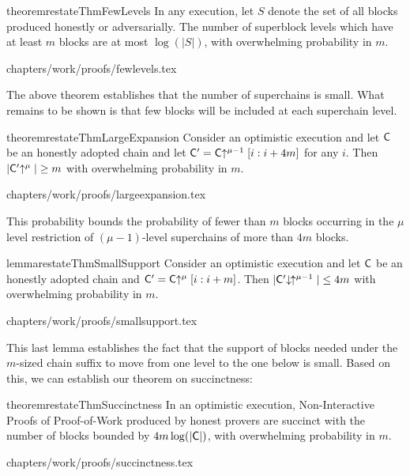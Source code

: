 \begin{restatable}{theorem}{restateThmFewLevels}
    \label{thm.few-levels}
    In any execution, let $S$ denote the set of all blocks produced honestly or
    adversarially. The number of superblock levels which have at least $m$
    blocks are at most $\log(|S|)$, with overwhelming probability in $m$.
\end{restatable}
{chapters/work/proofs/fewlevels.tex}

The above theorem establishes that the number of superchains is small. What
remains to be shown is that few blocks will be included at each superchain
level.

\begin{restatable}{theorem}{restateThmLargeExpansion}
    \label{thm.large-expansion}
    Consider an optimistic execution and let $\mathsf{C}$ be an honestly adopted
    chain and let $\mathsf{C}' = \mathsf{C}\negthickspace\uparrow^{\mu - 1}[i:i + 4m]$ for any $i$.
    Then $|\mathsf{C}'\negthickspace\uparrow^\mu| \geq m$ with overwhelming probability in $m$.
\end{restatable}
{chapters/work/proofs/largeexpansion.tex}

This probability bounds the probability of fewer than $m$ blocks occurring in
the $\mu$ level restriction of $(\mu - 1)$-level superchains of more than $4m$
blocks.

\begin{restatable}{lemma}{restateThmSmallSupport}
    \label{lem.small-support}
    Consider an optimistic execution and let $\mathsf{C}$ be an honestly adopted
    chain and $\mathsf{C}' = \mathsf{C}\negthickspace\uparrow^\mu[i:i + m]$. Then
    $|\mathsf{C}'\negthickspace\downarrow\,\negthickspace\uparrow^{\mu - 1}| \leq 4m$ with overwhelming
    probability in $m$.
\end{restatable}
{chapters/work/proofs/smallsupport.tex}

This last lemma establishes the fact that the support of blocks needed under
the $m$-sized chain suffix to move from one level to the one below is small.
Based on this, we can establish our theorem on succinctness:

\begin{restatable}{theorem}{restateThmSuccinctness}
    \label{thm.succinctness}
    In an optimistic execution, Non-Interactive Proofs of Proof-of-Work produced
    by honest provers are succinct with the number of blocks bounded by $4m
    \log(|\mathsf{C}|)$, with overwhelming probability in $m$.
\end{restatable}
{chapters/work/proofs/succinctness.tex}


